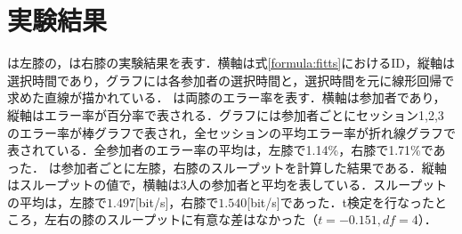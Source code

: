 \section{実験結果}
は左膝の，は右膝の実験結果を表す．横軸は式\ref{formula:fitts}におけるID，縦軸は選択時間であり，グラフには各参加者の選択時間と，選択時間を元に線形回帰で求めた直線が描かれている．
は両膝のエラー率を表す．横軸は参加者であり，縦軸はエラー率が百分率で表される．グラフには参加者ごとにセッション1,2,3のエラー率が棒グラフで表され，全セッションの平均エラー率が折れ線グラフで表されている．全参加者のエラー率の平均は，左膝で1.14\%，右膝で1.71\%であった．
は参加者ごとに左膝，右膝のスループットを計算した結果である．縦軸はスループットの値で，横軸は3人の参加者と平均を表している．スループットの平均は，左膝で$1.497$[bit/s]，右膝で$1.540$[bit/s]であった．t検定を行なったところ，左右の膝のスループットに有意な差はなかった（$t=-0.151, df=4$）．
